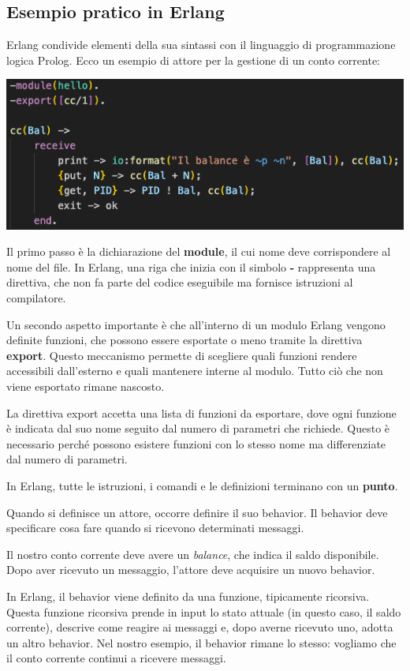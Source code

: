 \documentclass{article}
\begin{document}
\subsection*{Esempio pratico in Erlang}
Erlang condivide elementi della sua sintassi con il linguaggio di programmazione logica Prolog. Ecco un esempio di attore per la gestione di un conto corrente:
\begin{center}
    \includegraphics[width=1\textwidth]{img/hello_code.png}
\end{center}
Il primo passo è la dichiarazione del \textbf{module}, il cui nome deve corrispondere al nome del file. In Erlang, una riga che inizia con il simbolo \textbf{-} rappresenta una direttiva, che non fa parte del codice eseguibile ma fornisce istruzioni al compilatore.

Un secondo aspetto importante è che all'interno di un modulo Erlang vengono definite funzioni, che possono essere esportate o meno tramite la direttiva \textbf{export}. Questo meccanismo permette di scegliere quali funzioni rendere accessibili dall'esterno e quali mantenere interne al modulo. Tutto ciò che non viene esportato rimane nascosto. 

La direttiva export accetta una lista di funzioni da esportare, dove ogni funzione è indicata dal suo nome seguito dal numero di parametri che richiede. Questo è necessario perché possono esistere funzioni con lo stesso nome ma differenziate dal numero di parametri.

In Erlang, tutte le istruzioni, i comandi e le definizioni terminano con un \textbf{punto}.

Quando si definisce un attore, occorre definire il suo behavior. Il behavior deve specificare cosa fare quando si ricevono determinati messaggi.

Il nostro conto corrente deve avere un \textit{balance}, che indica il saldo disponibile. Dopo aver ricevuto un messaggio, l'attore deve acquisire un nuovo behavior.

In Erlang, il behavior viene definito da una funzione, tipicamente ricorsiva. Questa funzione ricorsiva prende in input lo stato attuale (in questo caso, il saldo corrente), descrive come reagire ai messaggi e, dopo averne ricevuto uno, adotta un altro behavior. Nel nostro esempio, il behavior rimane lo stesso: vogliamo che il conto corrente continui a ricevere messaggi.
\end{document}
